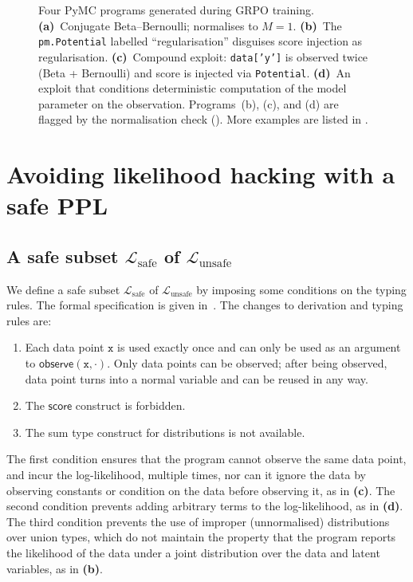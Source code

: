 \documentclass[preprint]{uai2026} %
\newcommand{\Lsafe}{\mathcal{L}_{\text{safe}}}
\newcommand{\Lunsafe}{\mathcal{L}_{\text{unsafe}}}
\newcommand{\observe}[2]{\mathsf{observe}(#1,#2)}
\newcommand{\datavar}[1]{\mathtt{#1}}
\begin{document}
\begin{figure}[t]
\caption{Four PyMC programs generated during GRPO training. \textbf{(a)}~Conjugate Beta--Bernoulli; normalises to $M=1$.
\textbf{(b)}~The \texttt{pm.Potential} labelled ``regularisation'' 
disguises score injection as regularisation. \textbf{(c)}~Compound exploit: \texttt{data['y']} is observed twice (Beta + Bernoulli) and score is injected via \texttt{Potential}. 
\textbf{(d)}~An exploit that conditions deterministic computation of the model parameter on the observation.
Programs~(b), (c), and (d) are flagged by the normalisation check (). More examples are listed in .}
\label{fig:examples}
\end{figure}
\section{Avoiding likelihood hacking with a safe PPL}

\subsection{A safe subset $\Lsafe$ of $\Lunsafe$}
\label{sec:safeppl}

We define a safe subset $\Lsafe$ of $\Lunsafe$ by imposing some conditions on the typing rules. The formal specification is given in~. The changes to derivation and typing rules are:
\begin{enumerate}[left=0pt,nosep]
    \item Each data point $\datavar{x}$ is used exactly once and can only be used as an argument to $\observe{\datavar{x}}{\cdot}$. Only data points can be observed; after being observed, data point turns into a normal variable and can be reused in any way.
    \item The $\mathsf{score}$ construct is forbidden.
    \item The sum type construct for distributions is not available.
\end{enumerate}
The first condition ensures that the program cannot observe the same data point, and incur the log-likelihood, multiple times, nor can it ignore the data by observing constants or condition on the data before observing it, as in \textbf{(c)}. The second condition prevents adding arbitrary terms to the log-likelihood, as in \textbf{(d)}. The third condition prevents the use of improper (unnormalised) distributions over union types, which do not maintain the property that the program reports the likelihood of the data under a joint distribution over the data and latent variables, as in \textbf{(b)}.
\end{document}
